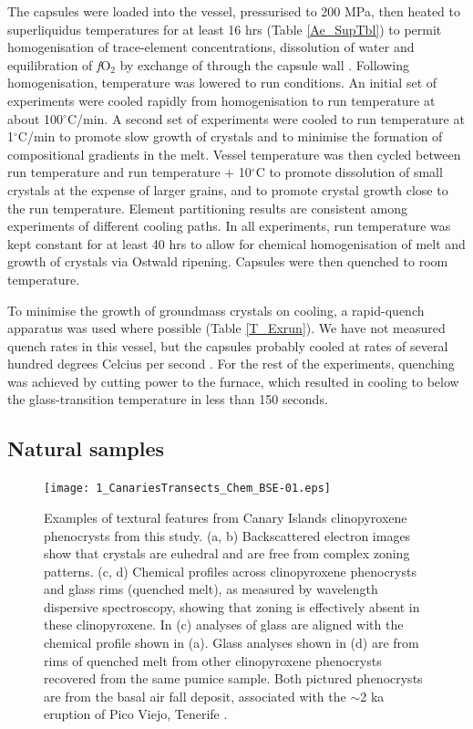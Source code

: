 \documentclass[final,authoryear,3p,times,twocolumn]{elsarticle}
\newcommand{\dgC}{$^\circ$C }
\newcommand{\dgCs}{$^\circ$C}
\newcommand{\fO}{\textit{f}O$_{2}$ }
\begin{document}
The capsules were loaded into the vessel, pressurised to 200 MPa, then heated to superliquidus temperatures for at least 16 hrs (Table \ref{Ae_SupTbl}) to permit homogenisation of trace-element concentrations, dissolution of water and equilibration of \fO by exchange of  through the capsule wall \citep[cf.][]{Gaillard2002}. Following homogenisation, temperature was lowered to run conditions. An initial set of experiments were cooled rapidly from homogenisation to run temperature at about 100\dgCs/min. A second set of experiments were cooled to run temperature at 1\dgCs/min to promote slow growth of crystals and to minimise the formation of compositional gradients in the melt. Vessel temperature was then cycled between run temperature and run temperature + 10\dgC to promote dissolution of small crystals at the expense of larger grains, and to promote crystal growth close to the run temperature. Element partitioning results are consistent among experiments of different cooling paths.
In all experiments, run temperature was kept constant for at least 40 hrs to allow for chemical homogenisation of melt and growth of crystals via Ostwald ripening. Capsules were then quenched to room temperature.

To minimise the growth of groundmass crystals on cooling, a rapid-quench apparatus was used where possible (Table \ref{T_Exrun}). We have not measured quench rates in this vessel, but the capsules probably cooled at rates of several hundred degrees Celcius per second \citep[e.g.][]{Berndt2002}. For the rest of the experiments, quenching was achieved by cutting power to the furnace, which resulted in cooling to below the glass-transition temperature \citep[$<350$\dgCs;][]{Giordano2005} in less than 150 seconds.

\subsection{Natural samples}

         \begin{figure}[ht]
        \begin{center}
        \texttt{[image: 1\_CanariesTransects\_Chem\_BSE-01.eps]}
		\caption[Examples of textural features from Canary Islands clinopyroxene phenocrysts from this study, with chemical transects]{Examples of textural features from Canary Islands clinopyroxene phenocrysts from this study. (a, b) Backscattered electron images show that crystals are euhedral and are free from complex zoning patterns. (c, d) Chemical profiles across clinopyroxene phenocrysts and glass rims (quenched melt), as measured by wavelength dispersive spectroscopy, showing that zoning is effectively absent in these clinopyroxene. In (c) analyses of glass are aligned with the chemical profile shown in (a). Glass analyses shown in (d) are from rims of quenched melt from other clinopyroxene phenocrysts recovered from the same pumice sample. Both pictured phenocrysts are from the basal air fall deposit, associated with the $\sim$2 ka eruption of Pico Viejo, Tenerife \citep{Ablay1995}.
        }
        \label{3_ChemTransect}
        \end{center}
        \end{figure}
\end{document}
